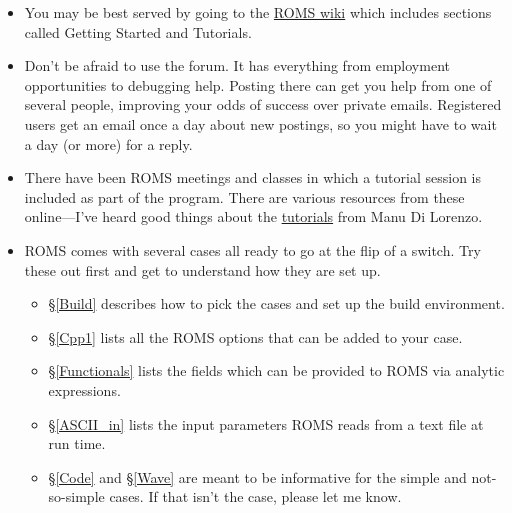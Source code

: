 \begin{itemize}
   \item You may be best served by going to the 
\href{https://www.myroms.org/wiki/}{ROMS wiki} which includes
sections called Getting Started and Tutorials.
   \item Don't be afraid to use the forum. It has everything from
employment opportunities to debugging help. Posting there can get
you help from one of several people, improving your odds of success
over private emails. Registered users get an email once a day about
new postings, so you might have to wait a day (or more) for a reply.
   \item There have been ROMS meetings and classes in which a tutorial
session is included as part of the program. There are various resources
from these online---I've heard good things about the
\href{http://eros.eas.gatech.edu/ROMS-Tutorial/tutorials.html}{tutorials}
from Manu Di Lorenzo.
   \item ROMS comes with several cases all ready to go at the flip
of a switch. Try these out first and get to understand how they
are set up.
    \begin{itemize}
      \item \S\ref{Build} describes how to pick the cases and set up
      the build environment.
      \item \S\ref{Cpp1} lists all the ROMS options that can be
      added to your case.
      \item \S\ref{Functionals} lists the fields which can be
      provided to ROMS via analytic expressions.
      \item \S\ref{ASCII_in} lists the input parameters ROMS reads
      from a text file at run time.
      \item \S\ref{Code} and \S\ref{Wave} are meant to be
      informative for the simple and not-so-simple cases. If that
      isn't the case, please let me know.
    \end{itemize}
\end{itemize}

